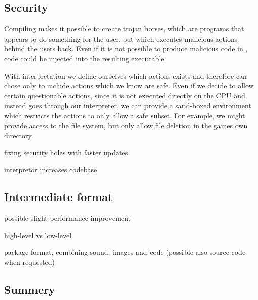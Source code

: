 \subsection{Security}
Compiling makes it possible to create trojan horses, which are programs that appears to do something for the user, but which executes malicious actions behind the users back. 
Even if it is not possible to produce malicious code in \productname{}, code could be injected into the resulting executable.

With interpretation we define ourselves which actions exists and therefore can chose only to include actions which we know are safe. 
Even if we decide to allow certain questionable actions, since it is not executed directly on the CPU and instead goes through our interpreter, we can provide a sand-boxed environment which restricts the actions to only allow a safe subset. For example, we might provide access to the file system, but only allow file deletion in the games own directory.

fixing security holes with faster updates

interpretor increases codebase

\subsection{Intermediate format}
possible slight performance improvement

high-level vs low-level

package format, combining sound, images and code (possible also source code when requested)

\subsection{Summery}

